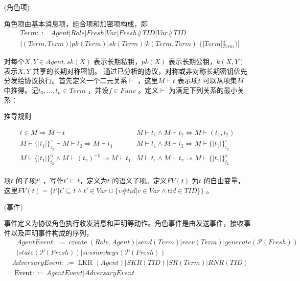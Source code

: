 \begin{definition}{(角色项)}

角色项由基本消息项，组合项和加密项构成，即
\begin{align}
  & Term::=Agent|Role|Fresh|Var|Fresh\#TID|Var\#TID \\
 & |(Term,Term)|pk(Term)|sk(Term)|k(Term,Term)|\{|Term|_{Term}^{a}\}|
\end{align}
\end{definition}


对每个$X,Y\in Agent,sk(X)$ 表示长期私钥，$pk(X)$ 表示长期公钥，$k(X,Y)$ 表示$X,Y$ 共享的长期对称密钥。
通过已分析的协议，对称或非对称长期密钥优先分发给协议执行。首先定义一个二元关系$\vdash$ ，这里$M\vdash t$ 表示项$t$ 可以从项集$M$ 中推得。记${{t}_{0}},...,{{t}_{n}}\in Term$ ，并设$f\in Func$ 。定义$\vdash$ 为满足下列关系的最小关系：
\begin{table}[htb]
  \centering
  \caption{推导规则}
\[\begin{matrix}
   t\in M\Rightarrow M\vdash t & M\vdash {{t}_{1}}\wedge M\vdash {{t}_{2}}\Leftrightarrow M\vdash ({{t}_{1}},{{t}_{2}})  \\
   M\vdash \{|{{t}_{1}}|\}_{{{t}_{2}}}^{s}\vdash M\vdash {{t}_{2}}\Rightarrow M\vdash {{t}_{1}} & M\vdash {{t}_{1}}\wedge M\vdash {{t}_{2}}\Rightarrow M\vdash \{|{{t}_{1}}|\}_{{{t}_{2}}}^{s}  \\
   M\vdash \{|{{t}_{1}}|\}_{{{t}_{2}}}^{a}\wedge M\vdash {{({{t}_{2}})}^{-1}}\Rightarrow M\vdash {{t}_{1}} & M\vdash {{t}_{1}}\wedge M\vdash {{t}_{2}}\Rightarrow M\vdash \{|{{t}_{1}}|\}_{{{t}_{2}}}^{a}  \\

\end{matrix}\]

\label{table:chap03-inference}
\end{table}

项$t$ 的子项$t'$ ，写作$t'\sqsubseteq t$，定义为$t$ 的语义子项。定义$FV(t)$ 为$t$ 的自由变量，这里$FV(t)=\{t'|t'\sqsubseteq t\wedge t'\in Var\cup \{v\#tid|v\in Var\wedge tid\in TID\}\}$  。


\begin{definition}{(事件)}

事件定义为协议角色执行收发消息和声明等动作。角色事件是由发送事件，接收事件以及声明事件构成的序列，
\begin{align}
 & \text{ }AgentEvent::=\operatorname{create}(Role,Agent)|send(Term)|recv(Term)|generate(\mathcal{P}(Fresh)) \\
 & \text{      }|state(\mathcal{P}(Fresh))|sessionkeys(\mathcal{P}(Fresh)) \\
 & AdversaryEvent::=\operatorname{LKR}(Agent)|SKR(TID)|SR(Term)|RNR(TID) \\
 & \text{    Event}::=AgentEvent|AdversaryEvent
\end{align}
\end{definition}

